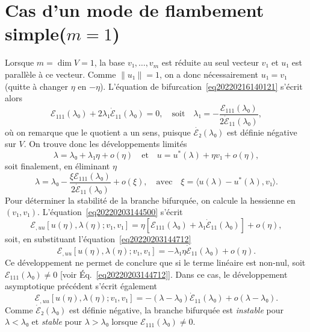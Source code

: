 \documentclass[12pt, final]{amsart}
\theoremstyle{definition}
\begin{document}
\section{Cas d'un mode de flambement simple(\(m = 1\))}

Lorsque \(m = \dim V = 1\), la base \(v₁, \ldots, v_m\) est réduite au seul vecteur \(v₁\) et \(u₁\) est parallèle à ce vecteur. Comme \(\lVert u₁ \rVert = 1\), on a donc nécessairement \(u₁ = v₁\)(quitte à changer \(η\) en \(- η\)). L'équation de bifurcation~\eqref{eq20220216140121} s'écrit alors
\begin{equation}
 \label{eq20220203144712} ℰ_{1 1 1}(λ₀) +
 2 λ₁ \dot{ℰ}_{1 1}(λ₀) = 0, \quad
 \text{soit} \quad λ₁ = - \frac{ℰ_{1 1 1}
 (λ₀)}{2 \dot{ℰ}_{1 1}(λ₀)},
\end{equation}
où on remarque que le quotient a un sens, puisque \(\dot{ℰ₂}(λ₀)\) est définie négative sur \(V\). On trouve donc les développements limités
\begin{equation}
 λ = λ₀ + λ₁ η + o(η) \quad \text{et} \quad u =
 u^{\ast}(λ) + η v₁ + o(η),
\end{equation}
soit finalement, en éliminant \(η\)
\begin{equation}
 λ = λ₀ - \frac{ξ ℰ_{1 1 1}
 (λ₀)}{2 \dot{ℰ}_{1 1}(λ₀)} + o(ξ),
 \quad \text{avec} \quad ξ = 〈 u(λ) - u^{\ast}(λ), v₁
 〉 .
\end{equation}
Pour déterminer la stabilité de la branche bifurquée, on calcule la hessienne en \((v₁, v₁)\). L'équation~\eqref{eq20220203144500} s'écrit
\begin{equation}
 ℰ_{, u u} [u(η), λ(η) ; v₁, v₁] = η
 [ℰ_{1 1 1}(λ₀) + λ₁
 \dot{ℰ}_{1 1}(λ₀)] + o(η),
\end{equation}
soit, en substituant l'équation~\eqref{eq20220203144712}
\begin{equation}
 ℰ_{, u u} [u(η), λ(η) ; v₁, v₁] = -
 λ₁ η \dot{ℰ}_{1 1}(λ₀) + o(η) .
\end{equation}
Ce développement ne permet de conclure que si le terme linéaire est non-nul, soit \(ℰ_{1 1 1}(λ₀) \neq 0\) [voir Éq.~\eqref{eq20220203144712}]. Dans ce cas, le développement asymptotique précédent s'écrit également
\begin{equation}
 ℰ_{, u u} [u(η), λ(η) ; v₁, v₁] = -
 (λ - λ₀) \dot{ℰ}_{1 1}(λ₀) + o
 (λ - λ₀) .
\end{equation}
Comme \(\dot{ℰ}₂(λ₀)\) est définie négative, la branche bifurquée est \emph{instable} pour \(λ < λ₀\) et \emph{stable} pour \(λ > λ₀\) lorsque \(ℰ_{1 1 1}(λ₀) \neq 0\).
\end{document}
